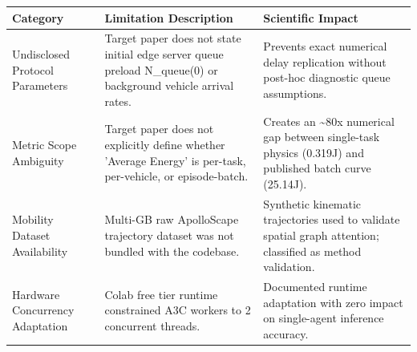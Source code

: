 \begin{tabular}{lll}
\toprule
Category & Limitation Description & Scientific Impact \\
\midrule
Undisclosed Protocol Parameters & Target paper does not state initial edge server queue preload N\_queue(0) or background vehicle arrival rates. & Prevents exact numerical delay replication without post-hoc diagnostic queue assumptions. \\
Metric Scope Ambiguity & Target paper does not explicitly define whether 'Average Energy' is per-task, per-vehicle, or episode-batch. & Creates an \textasciitilde 80x numerical gap between single-task physics (0.319J) and published batch curve (25.14J). \\
Mobility Dataset Availability & Multi-GB raw ApolloScape trajectory dataset was not bundled with the codebase. & Synthetic kinematic trajectories used to validate spatial graph attention; classified as method validation. \\
Hardware Concurrency Adaptation & Colab free tier runtime constrained A3C workers to 2 concurrent threads. & Documented runtime adaptation with zero impact on single-agent inference accuracy. \\
\bottomrule
\end{tabular}

